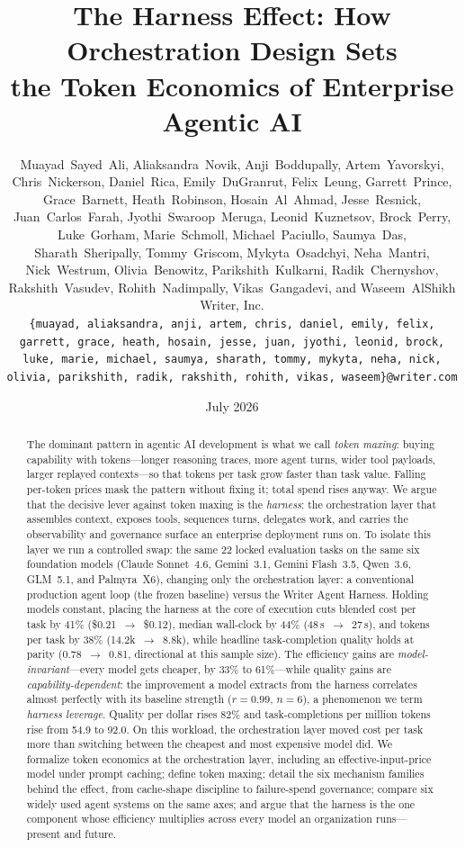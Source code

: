 \documentclass[11pt]{article}
\title{\LARGE\bf The Harness Effect: How Orchestration Design Sets\\[2pt] the Token Economics of Enterprise Agentic AI}
\author{\parbox{0.94\textwidth}{\centering
Muayad~Sayed~Ali, Aliaksandra~Novik, Anji~Boddupally, Artem~Yavorskyi, Chris~Nickerson, Daniel~Rica, Emily~DuGranrut, Felix~Leung, Garrett~Prince, Grace~Barnett, Heath~Robinson, Hosain~Al~Ahmad, Jesse~Resnick, Juan~Carlos~Farah, Jyothi~Swaroop~Meruga, Leonid~Kuznetsov, Brock~Perry, Luke~Gorham, Marie~Schmoll, Michael~Paciullo, Saumya~Das, Sharath~Sheripally, Tommy~Griscom, Mykyta~Osadchyi, Neha~Mantri, Nick~Westrum, Olivia~Benowitz, Parikshith~Kulkarni, Radik~Chernyshov, Rakshith~Vasudev, Rohith~Nadimpally, Vikas~Gangadevi, and Waseem~AlShikh\\[9pt]
Writer, Inc.\\[3pt]
{\small\texttt{\{muayad, aliaksandra, anji, artem, chris, daniel, emily, felix, garrett, grace, heath, hosain, jesse, juan, jyothi, leonid, brock, luke, marie, michael, saumya, sharath, tommy, mykyta, neha, nick, olivia, parikshith, radik, rakshith, rohith, vikas, waseem\}@writer.com}}
}}
\date{July 2026}
\newcommand{\NP}{22}                    %
\newcommand{\NM}{six}                   %
\newcommand{\CostA}{\$0.21}\newcommand{\CostB}{\$0.12}\newcommand{\CostD}{41\%}
\newcommand{\LatA}{48\,s}\newcommand{\LatB}{27\,s}\newcommand{\LatD}{44\%}
\newcommand{\TokA}{14.2k}\newcommand{\TokB}{8.8k}\newcommand{\TokD}{38\%}
\newcommand{\QA}{0.78}\newcommand{\QB}{0.81}
\newcommand{\QPDgain}{82\%}
\newcommand{\CPMA}{54.9}\newcommand{\CPMB}{92.0}\newcommand{\CPMgain}{68\%}
\newcommand{\CostRange}{33\% to 61\%}
\begin{document}
\maketitle

\begin{abstract}
The dominant pattern in agentic AI development is what we call \emph{token maxing}: buying capability with tokens---longer reasoning traces, more agent turns, wider tool payloads, larger replayed contexts---so that tokens per task grow faster than task value. Falling per-token prices mask the pattern without fixing it; total spend rises anyway. We argue that the decisive lever against token maxing is the \emph{harness}: the orchestration layer that assembles context, exposes tools, sequences turns, delegates work, and carries the observability and governance surface an enterprise deployment runs on. To isolate this layer we run a controlled swap: the same \NP{} locked evaluation tasks on the same \NM{} foundation models (Claude Sonnet~4.6, Gemini~3.1, Gemini Flash~3.5, Qwen~3.6, GLM~5.1, and Palmyra~X6), changing only the orchestration layer: a conventional production agent loop (the frozen baseline) versus the Writer Agent Harness. Holding models constant, placing the harness at the core of execution cuts blended cost per task by \CostD{} (\CostA{}~$\rightarrow$~\CostB{}), median wall-clock by \LatD{} (\LatA{}~$\rightarrow$~\LatB{}), and tokens per task by \TokD{} (\TokA{}~$\rightarrow$~\TokB{}), while headline task-completion quality holds at parity (\QA{}~$\rightarrow$~\QB{}, directional at this sample size). The efficiency gains are \emph{model-invariant}---every model gets cheaper, by \CostRange{}---while quality gains are \emph{capability-dependent}: the improvement a model extracts from the harness correlates almost perfectly with its baseline strength ($r=0.99$, $n=6$), a phenomenon we term \emph{harness leverage}. Quality per dollar rises \QPDgain{} and task-completions per million tokens rise from \CPMA{} to \CPMB{}. On this workload, the orchestration layer moved cost per task more than switching between the cheapest and most expensive model did. We formalize token economics at the orchestration layer, including an effective-input-price model under prompt caching; define token maxing; detail the six mechanism families behind the effect, from cache-shape discipline to failure-spend governance; compare six widely used agent systems on the same axes; and argue that the harness is the one component whose efficiency multiplies across every model an organization runs---present and future.
\end{abstract}
\end{document}
